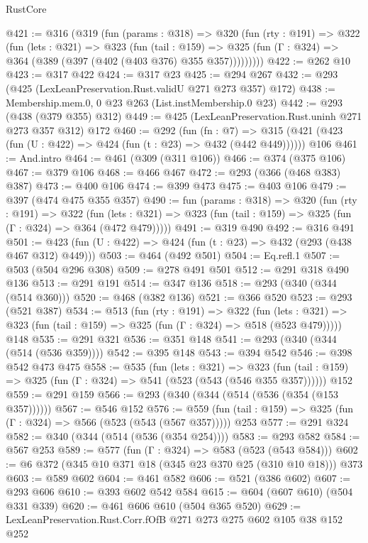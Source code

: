 \begin{lexlean}{RustCore}
\begin{coremodule}
@421 := @316
    (@319
      (fun (params : @318) =>
      @320
        (fun (rty : @191) =>
        @322
          (fun (lets : @321) =>
          @323
            (fun (tail : @159) =>
            @325 (fun (Γ : @324) => @364 (@389 (@397 (@402 (@403 @376) @355 @357)))))))))
@422 := @262 @10
@423 := @317 @422
@424 := @317 @23
@425 := @294 @267
@432 := @293 (@425 (LexLeanPreservation.Rust.validU @271 @273 @357) @172)
@438 := Membership.mem.{0, 0} @23 @263 (List.instMembership.{0} @23)
@442 := @293 (@438 (@379 @355) @312)
@449 := @425 (LexLeanPreservation.Rust.uninh @271 @273 @357 @312) @172
@460 := @292
    (fun (fn : @7) =>
    @315 (@421 (@423 (fun (U : @422) => @424 (fun (t : @23) => @432 (@442 @449))))))
    @106
@461 := And.intro
@464 := @461 (@309 (@311 @106))
@466 := @374 (@375 @106)
@467 := @379 @106
@468 := @466 @467
@472 := @293 (@366 (@468 @383) @387)
@473 := @400 @106
@474 := @399 @473
@475 := @403 @106
@479 := @397 (@474 @475 @355 @357)
@490 := fun (params : @318) =>
  @320
    (fun (rty : @191) =>
    @322
      (fun (lets : @321) => @323 (fun (tail : @159) => @325 (fun (Γ : @324) => @364 (@472 @479)))))
@491 := @319 @490
@492 := @316 @491
@501 := @423 (fun (U : @422) => @424 (fun (t : @23) => @432 (@293 (@438 @467 @312) @449)))
@503 := @464 (@492 @501)
@504 := Eq.refl.{1}
@507 := @503 (@504 @296 @308)
@509 := @278 @491 @501
@512 := @291 @318 @490 @136
@513 := @291 @191
@514 := @347 @136
@518 := @293 (@340 (@344 (@514 @360)))
@520 := @468 (@382 @136)
@521 := @366 @520
@523 := @293 (@521 @387)
@534 := @513
    (fun (rty : @191) =>
    @322
      (fun (lets : @321) => @323 (fun (tail : @159) => @325 (fun (Γ : @324) => @518 (@523 @479)))))
    @148
@535 := @291 @321
@536 := @351 @148
@541 := @293 (@340 (@344 (@514 (@536 @359))))
@542 := @395 @148
@543 := @394 @542
@546 := @398 @542 @473 @475
@558 := @535
    (fun (lets : @321) =>
    @323 (fun (tail : @159) => @325 (fun (Γ : @324) => @541 (@523 (@543 (@546 @355 @357))))))
    @152
@559 := @291 @159
@566 := @293 (@340 (@344 (@514 (@536 (@354 (@153 @357))))))
@567 := @546 @152
@576 := @559 (fun (tail : @159) => @325 (fun (Γ : @324) => @566 (@523 (@543 (@567 @357))))) @253
@577 := @291 @324
@582 := @340 (@344 (@514 (@536 (@354 @254))))
@583 := @293 @582
@584 := @567 @253
@589 := @577 (fun (Γ : @324) => @583 (@523 (@543 @584)))
@602 := @6 @372 (@345 @10 @371 @18 (@345 @23 @370 @25 (@310 @10 @18))) @373
@603 := @589 @602
@604 := @461 @582
@606 := @521 (@386 @602)
@607 := @293 @606
@610 := @393 @602 @542 @584
@615 := @604 (@607 @610) (@504 @331 @339)
@620 := @461 @606 @610 (@504 @365 @520)
@629 := LexLeanPreservation.Rust.Corr.fOfB @271 @273 @275 @602 @105 @38 @152 @252

\end{coremodule}
\end{lexlean}
